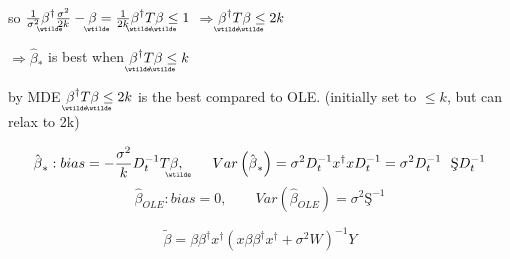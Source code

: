\documentclass{article}
\begin{document}
so $\frac{1}{\sigma ^{2}}%
\underaccent{\wtilde}{\beta}%
^{\dagger }\frac{\sigma ^{2}}{2k}-%
\underaccent{\wtilde}{\beta}%
=\frac{1}{2k}%
\underaccent{\wtilde}{\beta}%
^{\dagger }T%
\underaccent{\wtilde}{\beta}%
\leq 1$ $\Rightarrow $\underline{$%
\underaccent{\wtilde}{\beta}%
^{\dagger }T%
\underaccent{\wtilde}{\beta}%
\leq 2k$}

$\Rightarrow \hat{\beta}_{\ast }$ is best when $%
\underaccent{\wtilde}{\beta}%
^{\dagger }T%
\underaccent{\wtilde}{\beta}%
\leq k$

by MDE $%
\underaccent{\wtilde}{\beta}%
^{\dagger }T%
\underaccent{\wtilde}{\beta}%
\leq 2k$ is the best compared to OLE. (initially set to $\leq k$, but can
relax to 2k)

\bigskip

\begin{equation*}
\hat{\beta}_{\ast }:bias=-\frac{\sigma ^{2}}{k}D_{t}^{-1}T%
\underaccent{\wtilde}{\beta}%
,\qquad Var\left( \hat{\beta}_{\ast }\right) =\sigma
^{2}D_{t}^{-1}x^{\dagger }xD_{t}^{-1}=\sigma ^{2}D_{t}^{-1}\text{\c{S}}%
D_{t}^{-1}
\end{equation*}%
\begin{equation*}
\hat{\beta}_{OLE}:bias=0,\qquad Var\left( \hat{\beta}_{OLE}\right) =\sigma
^{2}\text{\c{S}}^{-1}
\end{equation*}

\bigskip 

\begin{equation*}
\tilde{\beta}=\beta \beta ^{\dagger }x^{\dagger }\left( x\beta \beta
^{\dagger }x^{\dagger }+\sigma ^{2}W\right) ^{-1}Y
\end{equation*}
\end{document}
